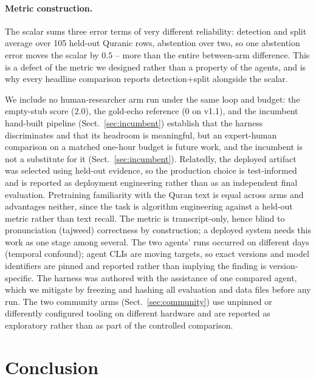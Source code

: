 \documentclass[runningheads]{llncs}
\begin{document}
\paragraph{Metric construction.} The scalar sums three error terms of very
different reliability: detection and split average over 105 held-out Quranic
rows, abstention over two, so one abstention error moves the scalar by $0.5$
-- more than the entire between-arm difference. This is a defect of the
metric we designed rather than a property of the agents, and is why every
headline comparison reports detection+split alongside the scalar.

We
include no human-researcher arm run under the same loop and budget: the
empty-stub score ($2.0$), the gold-echo reference ($0$ on v1.1), and the
incumbent hand-built pipeline (Sect.~\ref{sec:incumbent}) establish that
the harness discriminates and that its headroom is meaningful, but an
expert-human comparison on a matched one-hour budget is future work, and
the incumbent is not a substitute for it (Sect.~\ref{sec:incumbent}).
Relatedly, the deployed artifact was selected using held-out evidence, so
the production choice is test-informed and is reported as deployment
engineering rather than as an independent final evaluation. Pretraining familiarity with the Quran text is equal across arms and
advantages neither, since the task is algorithm engineering against a
held-out metric rather than text recall. The metric is transcript-only,
hence blind to pronunciation (tajweed) correctness by construction; a
deployed system needs this work as one stage among several. The two agents'
runs occurred on different days (temporal confound); agent CLIs are moving
targets, so exact versions and model identifiers are pinned and reported
rather than implying the finding is version-specific. The harness
was authored with the assistance of one compared agent, which we mitigate by
freezing and hashing all evaluation and data files before any run. The two
community arms (Sect.~\ref{sec:community}) use unpinned or differently
configured tooling on different hardware and are reported as exploratory
rather than as part of the controlled comparison.

\section{Conclusion}
\label{sec:conclusion}
\end{document}
